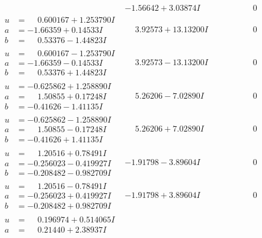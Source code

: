 \documentclass[1p]{elsarticle_modified}
\theoremstyle{definition}
\begin{document}
$$\begin{array}{c|c|c}
 & -1.56642 + 3.03874 I & \phantom{-0.000000 } 0 \\ \hline\begin{aligned}
u &= \phantom{-}0.600167 + 1.253790 I \\
a &= -1.66359 + 0.14533 I \\
b &= \phantom{-}0.53376 - 1.44823 I\end{aligned}
 & \phantom{-}3.92573 + 13.13200 I & \phantom{-0.000000 } 0 \\ \hline\begin{aligned}
u &= \phantom{-}0.600167 - 1.253790 I \\
a &= -1.66359 - 0.14533 I \\
b &= \phantom{-}0.53376 + 1.44823 I\end{aligned}
 & \phantom{-}3.92573 - 13.13200 I & \phantom{-0.000000 } 0 \\ \hline\begin{aligned}
u &= -0.625862 + 1.258890 I \\
a &= \phantom{-}1.50855 + 0.17248 I \\
b &= -0.41626 - 1.41135 I\end{aligned}
 & \phantom{-}5.26206 - 7.02890 I & \phantom{-0.000000 } 0 \\ \hline\begin{aligned}
u &= -0.625862 - 1.258890 I \\
a &= \phantom{-}1.50855 - 0.17248 I \\
b &= -0.41626 + 1.41135 I\end{aligned}
 & \phantom{-}5.26206 + 7.02890 I & \phantom{-0.000000 } 0 \\ \hline\begin{aligned}
u &= \phantom{-}1.20516 + 0.78491 I \\
a &= -0.256023 - 0.419927 I \\
b &= -0.208482 - 0.982709 I\end{aligned}
 & -1.91798 - 3.89604 I & \phantom{-0.000000 } 0 \\ \hline\begin{aligned}
u &= \phantom{-}1.20516 - 0.78491 I \\
a &= -0.256023 + 0.419927 I \\
b &= -0.208482 + 0.982709 I\end{aligned}
 & -1.91798 + 3.89604 I & \phantom{-0.000000 } 0 \\ \hline\begin{aligned}
u &= \phantom{-}0.196974 + 0.514065 I \\
a &= \phantom{-}0.21440 + 2.38937 I \\

\end{aligned}
\end{array}$$
\end{document}
